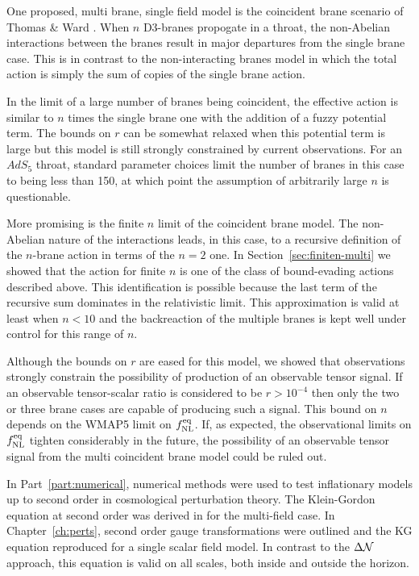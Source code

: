 One proposed, multi brane, single field model is the coincident brane scenario of
Thomas \& Ward \cite{thomasward}. When $n$ D3-branes propogate in a throat, the
non-Abelian interactions between the branes result in major departures from the
single brane case. This is in contrast to the non-interacting branes model in which
the total action is simply the sum of copies of the single brane action.

In the limit of a large number of branes being coincident, the effective action is
similar to $n$ times the single brane one with the addition of a fuzzy potential
term. The bounds on $r$ can be somewhat relaxed when this potential term is large
but this model is still strongly constrained by current observations. For an $AdS_5$
throat, standard parameter choices limit the number of branes in this case to being
less than 150, at which point the assumption of arbitrarily large $n$ is
questionable.

More promising is the finite $n$ limit of the coincident brane model. The
non-Abelian nature of the interactions leads, in this case, to a recursive definition
of the $n$-brane action in terms of the $n=2$ one. In
Section~\ref{sec:finiten-multi} we showed that the action for finite $n$ is one of
the class of bound-evading actions described above. This identification is possible
because the last term of the recursive sum dominates in the relativistic limit. This
approximation is valid at least when $n<10$ and the backreaction of the multiple
branes is kept well under control for this range of $n$.

Although the bounds on $r$ are eased
for this model, we showed that observations strongly constrain the possibility of
production of an observable tensor signal. If an observable tensor-scalar ratio is
considered to be $r>10^{-4}$ then only the two or three brane cases are capable of
producing such a signal. This bound on $n$ depends on the WMAP5 limit on $f_{\mathrm{NL}}^{\mathrm{eq}}$.
If, as expected, the observational limits on $f_{\mathrm{NL}}^{\mathrm{eq}}$ tighten considerably in the
future, the possibility of an observable tensor signal from the multi coincident
brane model could be ruled out.

\pagebreak
In Part~\ref{part:numerical}, numerical methods were used to test inflationary
models up to second order in cosmological perturbation theory. The Klein-Gordon
equation at second order was derived in  for the multi-field
case. In Chapter~\ref{ch:perts}, second order gauge transformations were outlined
and the KG equation reproduced for a single scalar field model. In contrast to the
$\Delta \mathcal{N}$ approach, this equation is valid on all scales, both inside and outside
the horizon. 

